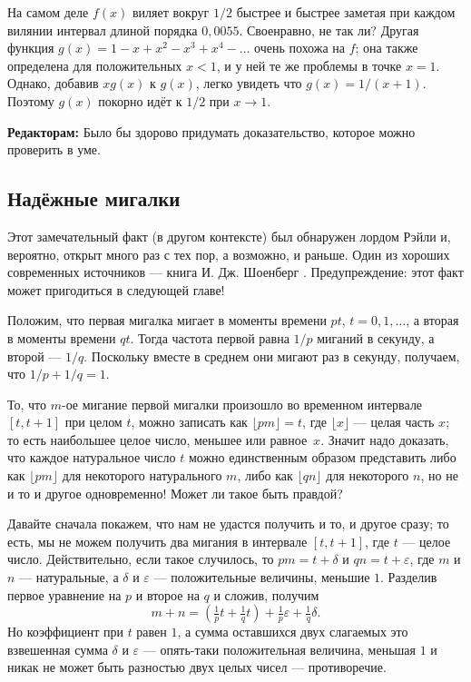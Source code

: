 На самом деле $f(x)$ виляет вокруг $1/2$ быстрее и быстрее заметая при каждом вилянии интервал длиной порядка $0{,}0055$. 
Своенравно, не так ли?
Другая функция $g(x)=1-x+x^2-x^3+x^4-\dots$ очень похожа на $f$;
она также определена для положительных $x < 1$, и у ней те же проблемы в точке $x = 1$.
Однако, добавив $xg(x)$ к $g(x)$, легко увидеть что $g(x)=1/(x+1)$.
Поэтому $g(x)$ покорно идёт к $1/2$ при $x \to 1$.

\begin{addedbytheeditors}
\textbf{Редакторам:}
Было бы здорово придумать доказательство, которое можно проверить в уме.
\end{addedbytheeditors}

\subsection*{Надёжные мигалки}

Этот замечательный факт (в другом контексте) был обнаружен лордом Рэйли и, вероятно, открыт много раз с тех пор, а возможно, и раньше.
Один из хороших современных источников --- книга И. Дж. Шоенберг \cite{schoenberg}.
Предупреждение: этот факт может пригодиться в следующей главе!

Положим, что первая мигалка мигает в моменты времени $pt$, $t = 0, 1, \dots$, а вторая в моменты времени $qt$.
Тогда частота первой равна $1/p$ миганий в секунду, а второй --- $1/q$.
Поскольку вместе в среднем они мигают раз в секунду, получаем, что $1/p + 1/q = 1$.

То, что $m$-ое мигание первой мигалки произошло во временном интервале $[t, t + 1]$ при целом $t$,
можно записать как $\lfloor pm\rfloor = t$, где $\lfloor x\rfloor$ — целая часть $x$; то есть наибольшее целое число, меньшее или равное~$x$.
Значит надо доказать, что каждое натуральное число $t$ можно единственным образом представить либо как $\lfloor pm\rfloor$ для некоторого натурального $m$, либо как $\lfloor qn\rfloor$ для некоторого $n$, но не и то и другое одновременно!
Может ли такое быть правдой?

Давайте сначала покажем, что нам не удастся получить и то, и другое сразу;
то есть, мы не можем получить два мигания в интервале $[t, t+1]$, где $t$ --- целое число.
Действительно, если такое случилось, то $pm = t+\delta$ и $qn = t + \varepsilon$, где $m$ и $n$ --- натуральные, а $\delta$ и $\varepsilon$ --- положительные величины, меньшие $1$. 
Разделив первое уравнение на $p$ и второе на $q$ и сложив, получим
\[m+n=(\tfrac1pt+\tfrac1qt)+\tfrac1p\varepsilon+\tfrac1q\delta.\]
Но коэффициент при $t$ равен $1$, а сумма оставшихся двух слагаемых это взвешенная сумма $\delta$ и $\varepsilon$ --- опять-таки положительная величина, меньшая $1$ и никак не может быть разностью двух целых чисел --- противоречие.

